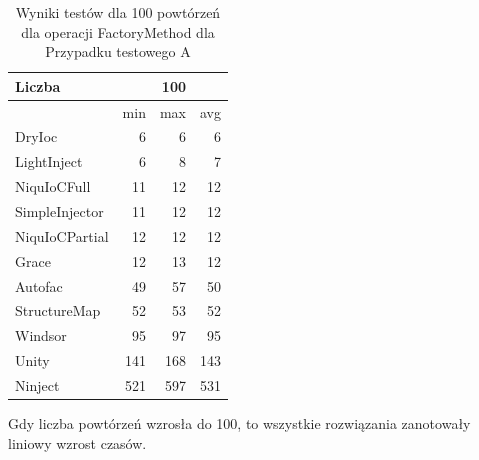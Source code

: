 \documentclass[12pt]{article}
\begin{document}
\begin{table}[H]
\captionsetup{belowskip=0pt,aboveskip=0pt}
\begin{center}
\begin{small}
	\begin{tabular}{ | l | r r r | }
    		\hline
Liczba & & 100 & \\ \hline
 & min & max & avg \\ \hline
DryIoc & 6 & 6 & 6 \\ \hline
LightInject & 6 & 8 & 7 \\ \hline
NiquIoCFull & 11 & 12 & 12 \\ \hline
SimpleInjector & 11 & 12 & 12 \\ \hline
NiquIoCPartial & 12 & 12 & 12 \\ \hline
Grace & 12 & 13 & 12 \\ \hline
Autofac & 49 & 57 & 50 \\ \hline
StructureMap & 52 & 53 & 52 \\ \hline
Windsor & 95 & 97 & 95 \\ \hline
Unity & 141 & 168 & 143 \\ \hline
Ninject & 521 & 597 & 531 \\ \hline
  	\end{tabular}
\end{small}
\end{center}
\caption{Wyniki testów dla 100 powtórzeń dla operacji FactoryMethod dla Przypadku testowego A}
\label{TestCaseA_FactoryMethod100}
\end{table}
Gdy liczba powtórzeń wzrosła do 100, to wszystkie rozwiązania zanotowały liniowy wzrost czasów.
\\ \\
\end{document}
